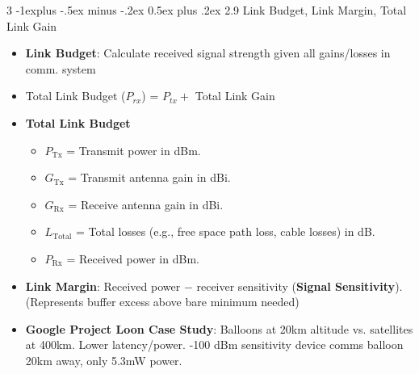 \documentclass[a4paper, 9pt, landscape]{extarticle}
\makeatletter
\renewcommand{\subsection}{\@startsection{subsection}{2}{0mm}%
                                {-1explus -.5ex minus -.2ex}%
                                {0.5ex plus .2ex}%
                                {\normalfont\normalsize\bfseries}}
\makeatother
\begin{document}
\begin{multicols*}{3}
\subsection{2.9 Link Budget, Link Margin, Total Link Gain}
\begin{itemize}
  \item \textbf{Link Budget}: Calculate received signal strength given all gains/losses in comm. system
  \item Total Link Budget ($P_{rx}$) = $P_{tx} + $ Total Link Gain 
  \item \textbf{Total Link Budget} 
  \begin{itemize}
    \item $P_{\text{Tx}}$ = Transmit power in dBm.
    \item $G_{\text{Tx}}$ = Transmit antenna gain in dBi.
    \item $G_{\text{Rx}}$ = Receive antenna gain in dBi.
    \item $L_{\text{Total}}$ = Total losses (e.g., free space path loss, cable losses) in dB.
    \item $P_{\text{Rx}}$ = Received power in dBm.
  \end{itemize}
  \item \textbf{Link Margin}: Received power $-$ receiver sensitivity (\textbf{Signal Sensitivity}). (Represents buffer excess above bare minimum needed)
  \item \textbf{Google Project Loon Case Study}: Balloons at 20km altitude vs. satellites at 400km. Lower latency/power. -100 dBm sensitivity device comms balloon 20km away, only 5.3mW power.
\end{itemize}




\end{multicols*}
\end{document}
